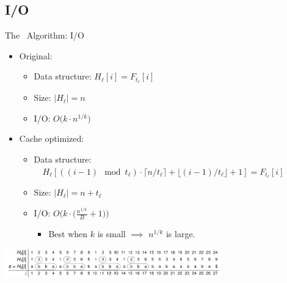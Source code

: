 \documentclass{beamer}
\begin{document}
\subsection{I/O}
\begin{frame}{The \fprintk\ Algorithm: I/O}
    \begin{itemize}
        \item Original:
        \begin{itemize}
            \item Data structure: $H_\ell[i] = F_{t_\ell}[i]$
            \item Size: $|H_\ell| = n$
            \item I/O: $O\big(k\cdot n^{1/k}\big)$
        \end{itemize}
        \item Cache optimized:
        \begin{itemize}
            \item Data structure: \\~~$H_\ell[((i-1)\mod t_\ell)\cdot\lceil n/t_\ell\rceil+\lfloor (i-1)/t_\ell\rfloor+1] = F_{t_\ell}[i]$
            \item Size: $|H_\ell| = n+t_\ell$
            \item I/O: $O\Big(k\cdot\Big(\frac{n^{1/k}}{B}+1\Big)\Big)$
            \begin{itemize}
                \item Best when $k$ is small $\implies$ $n^{1/k}$ is large.
            \end{itemize}
        \end{itemize}
     \end{itemize}
    \begin{center}
        \includegraphics[width=0.7\textwidth,page=2]{../doc/fingerprint.pdf}\\
    \end{center}
\end{frame}
\end{document}
